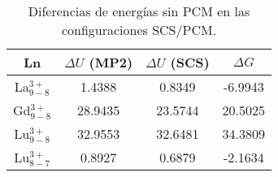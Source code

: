 \begin{table}[h!]
\centering
\caption{\footnotesize Diferencias de energ\'ias sin PCM en las
         configuraciones SCS/PCM.}%
\begin{tabular}{c|ccc}\hline\hline
Ln & $\Delta U$ (MP2)  & $\Delta U$ (SCS) & $\Delta G$ \\ \hline
La$^{3+}_{9-8}$ &   1.4388 &   0.8349 &  -6.9943 \\
Gd$^{3+}_{9-8}$ &  28.9435 &  23.5744 &  20.5025 \\ 
Lu$^{3+}_{9-8}$ &  32.9553 &  32.6481 &  34.3809 \\ 
Lu$^{3+}_{8-7}$ &   0.8927 &   0.6879 &  -2.1634 \\ 
\hline \end{tabular}\label{t2}\end{table}
